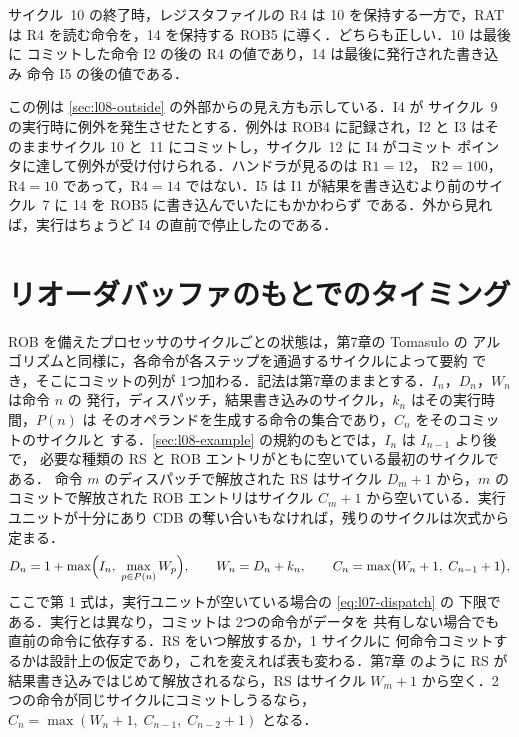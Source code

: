 \documentclass[../main.tex]{subfiles}
\begin{document}
サイクル~10 の終了時，レジスタファイルの R4 は 10 を保持する一方で，RAT は
R4 を読む命令を，14 を保持する ROB5 に導く．どちらも正しい．10 は最後に
コミットした命令 I2 の後の R4 の値であり，14 は最後に発行された書き込み
命令 I5 の後の値である．

この例は \cref{sec:l08-outside} の外部からの見え方も示している．I4 が
サイクル~9 の実行時に例外を発生させたとする．例外は ROB4 に記録され，I2 と
I3 はそのままサイクル 10 と~11 にコミットし，サイクル~12 に I4 がコミット
ポインタに達して例外が受け付けられる．ハンドラが見るのは $\text{R1}=12$，
$\text{R2}=100$，$\text{R4}=10$ であって，$\text{R4}=14$ ではない．I5 は
I1 が結果を書き込むより前のサイクル~7 に 14 を ROB5 に書き込んでいたにもかかわらず
である．外から見れば，実行はちょうど I4 の直前で停止したのである．

\section{リオーダバッファのもとでのタイミング}
\label{sec:l08-timing}

ROB を備えたプロセッサのサイクルごとの状態は，第7章の Tomasulo の
アルゴリズムと同様に，各命令が各ステップを通過するサイクルによって要約
でき，そこにコミットの列が 1つ加わる．記法は第7章のままとする．$I_n$，$D_n$，$W_n$ は命令 $n$ の
発行，ディスパッチ，結果書き込みのサイクル，$k_n$ はその実行時間，$P(n)$ は
そのオペランドを生成する命令の集合であり，$C_n$ をそのコミットのサイクルと
する．\cref{sec:l08-example} の規約のもとでは，$I_n$ は $I_{n-1}$ より後で，
必要な種類の RS と ROB エントリがともに空いている最初のサイクルである．
命令 $m$ のディスパッチで解放された RS はサイクル $D_m+1$ から，$m$ の
コミットで解放された ROB エントリはサイクル $C_m+1$ から空いている．実行
ユニットが十分にあり CDB の奪い合いもなければ，残りのサイクルは次式から
定まる．
\begin{equation}
  D_n = 1 + \max\Bigl(I_n,\; \max_{p \in P(n)} W_p\Bigr), \qquad
  W_n = D_n + k_n, \qquad
  C_n = \max\bigl(W_n + 1,\; C_{n-1} + 1\bigr),
  \label{eq:l08-timing}
\end{equation}
ここで第 1 式は，実行ユニットが空いている場合の \cref{eq:l07-dispatch} の
下限である．実行とは異なり，コミットは 2つの命令がデータを
共有しない場合でも直前の命令に依存する．RS をいつ解放するか，1 サイクルに
何命令コミットするかは設計上の仮定であり，これを変えれば表も変わる．第7章
のように RS が結果書き込みではじめて解放されるなら，RS はサイクル $W_m+1$
から空く．2つの命令が同じサイクルにコミットしうるなら，
$C_n = \max(W_n+1,\; C_{n-1},\; C_{n-2}+1)$ となる．
\end{document}
